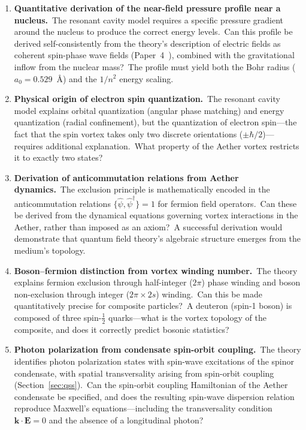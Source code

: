 ﻿\documentclass[12pt,letterpaper]{article}
\begin{document}
\begin{enumerate}[leftmargin=2em]
  \item \textbf{Quantitative derivation of the near-field pressure profile near a nucleus.}\
    The resonant cavity model requires a specific pressure gradient around the
    nucleus to produce the correct energy levels.\ Can this profile be derived
    self-consistently from the theory's description of electric fields as coherent
    spin-phase wave fields (Paper~4~\cite{otto-em}), combined with the gravitational
    inflow from the nuclear mass?\ The profile must yield both the Bohr radius
    ($a_0 = 0.529$~\AA) and the $1/n^2$ energy scaling.

  \item \textbf{Physical origin of electron spin quantization.}\ The resonant cavity
    model explains orbital quantization (angular phase matching) and energy quantization
    (radial confinement), but the quantization of electron spin---the fact that the spin
    vortex takes only two discrete orientations ($\pm\hbar/2$)---requires additional
    explanation.\ What property of the Aether vortex restricts it to exactly two states?


  \item \textbf{Derivation of anticommutation relations from Aether dynamics.}\
    The exclusion principle is mathematically encoded in the anticommutation
    relations $\{\hat{\psi}, \hat{\psi}^\dagger\} = 1$ for fermion field operators.\
    Can these be derived from the dynamical equations governing vortex interactions
    in the Aether, rather than imposed as an axiom?\ A successful derivation would
    demonstrate that quantum field theory's algebraic structure emerges from the
    medium's topology.

  \item \textbf{Boson--fermion distinction from vortex winding number.}\ The theory
    explains fermion exclusion through half-integer ($2\pi$) phase winding and boson
    non-exclusion through integer ($2\pi \times 2s$) winding.\ Can this be made
    quantitatively precise for composite particles?\ A deuteron (spin-1 boson) is
    composed of three spin-$\tfrac{1}{2}$ quarks---what is the vortex topology of the
    composite, and does it correctly predict bosonic statistics?


  \item \textbf{Photon polarization from condensate spin-orbit coupling.}\ The
    theory identifies photon polarization states with spin-wave excitations of
    the spinor condensate, with spatial transversality arising from spin-orbit
    coupling (Section~\ref{sec:qss}).\ Can the spin-orbit coupling Hamiltonian
    of the Aether condensate be specified, and does the resulting spin-wave
    dispersion relation reproduce Maxwell's equations---including the
    transversality condition $\mathbf{k} \cdot \mathbf{E} = 0$ and the
    absence of a longitudinal photon?


\end{enumerate}
\end{document}
